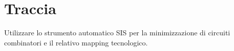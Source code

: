 %

\section{Traccia}

Utilizzare lo strumento automatico SIS per la minimizzazione di circuiti
combinatori e il relativo mapping tecnologico.%

